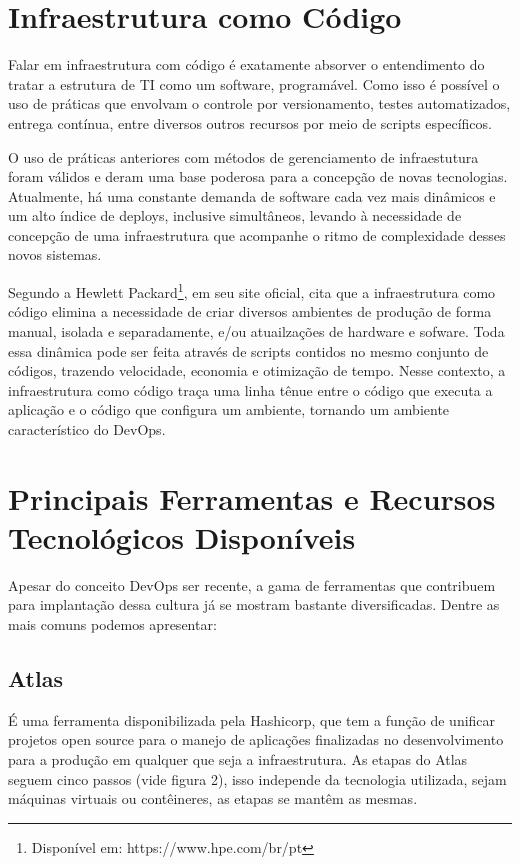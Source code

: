 \section{Infraestrutura como Código}
Falar em infraestrutura com código é exatamente absorver o entendimento do tratar a estrutura de TI como um software, programável. Como isso é possível o uso de práticas que envolvam o controle por versionamento, testes automatizados, entrega contínua, entre diversos outros recursos por meio de scripts específicos.

O uso de práticas anteriores com métodos de gerenciamento de infraestutura foram válidos e deram uma base poderosa para a concepção de novas tecnologias. Atualmente, há  uma constante demanda de software cada vez mais dinâmicos e um alto índice de deploys, inclusive simultâneos, levando à necessidade de concepção de uma infraestrutura que acompanhe o ritmo de complexidade desses novos sistemas.

Segundo a Hewlett Packard\footnote{Disponível em: https://www.hpe.com/br/pt}, em seu site oficial, cita que a infraestrutura como código elimina a necessidade de criar diversos ambientes de produção de forma manual, isolada e separadamente, e/ou atuailzações de hardware e sofware. Toda essa dinâmica pode ser feita através de scripts contidos no mesmo conjunto de códigos, trazendo velocidade, economia e otimização de tempo. Nesse contexto, a infraestrutura como código traça uma linha tênue entre o código que executa a aplicação e o código que configura um ambiente, tornando um ambiente característico do DevOps.


\section{Principais Ferramentas e Recursos Tecnológicos Disponíveis}
Apesar do conceito DevOps ser recente, a gama de ferramentas que contribuem para implantação dessa cultura já se mostram bastante diversificadas. Dentre as mais comuns podemos apresentar:

\subsection{Atlas}
É uma ferramenta disponibilizada pela Hashicorp, que tem a função de unificar projetos open source para o manejo de aplicações finalizadas no desenvolvimento para a produção em qualquer que seja a infraestrutura.
As etapas do Atlas seguem cinco passos (vide figura 2), isso independe da tecnologia utilizada, sejam máquinas virtuais ou contêineres, as etapas se mantêm as mesmas. \cite{hashimoto}

